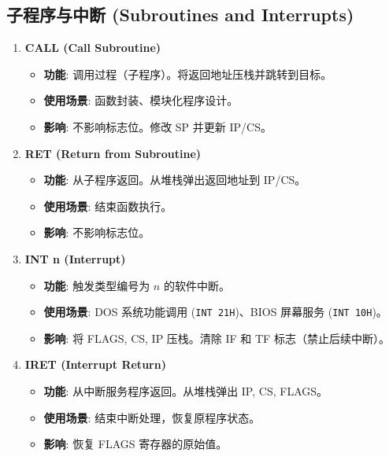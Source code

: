 \documentclass[12pt,a4paper]{ctexart}
\begin{document}
\subsection{子程序与中断 (Subroutines and Interrupts)}
\begin{enumerate}
    \item \textbf{CALL (Call Subroutine)}
    \begin{itemize}
        \item \textbf{功能}: 调用过程（子程序）。将返回地址压栈并跳转到目标。
        \item \textbf{使用场景}: 函数封装、模块化程序设计。
        \item \textbf{影响}: 不影响标志位。修改 SP 并更新 IP/CS。
    \end{itemize}
    \item \textbf{RET (Return from Subroutine)}
    \begin{itemize}
        \item \textbf{功能}: 从子程序返回。从堆栈弹出返回地址到 IP/CS。
        \item \textbf{使用场景}: 结束函数执行。
        \item \textbf{影响}: 不影响标志位。
    \end{itemize}
    \item \textbf{INT n (Interrupt)}
    \begin{itemize}
        \item \textbf{功能}: 触发类型编号为 $n$ 的软件中断。
        \item \textbf{使用场景}: DOS 系统功能调用 (\texttt{INT 21H})、BIOS 屏幕服务 (\texttt{INT 10H})。
        \item \textbf{影响}: 将 FLAGS, CS, IP 压栈。清除 IF 和 TF 标志（禁止后续中断）。
    \end{itemize}
    \item \textbf{IRET (Interrupt Return)}
    \begin{itemize}
        \item \textbf{功能}: 从中断服务程序返回。从堆栈弹出 IP, CS, FLAGS。
        \item \textbf{使用场景}: 结束中断处理，恢复原程序状态。
        \item \textbf{影响}: 恢复 FLAGS 寄存器的原始值。
    \end{itemize}
\end{enumerate}
\end{document}
